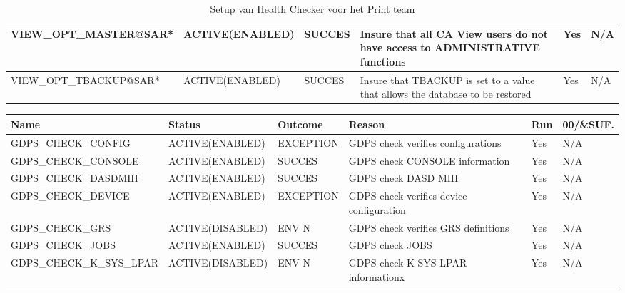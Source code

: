 \begin{landscape}
\begin{table}[h]
\begin{tabular}{|l|l|l|p{4.5cm}|l|l|}
			VIEW\_OPT\_MASTER@SAR*      & ACTIVE(ENABLED) & SUCCES           & Insure   that all CA View users do not have access to ADMINISTRATIVE functions             & Yes          & N/A                \\ \hline
			VIEW\_OPT\_TBACKUP@SAR*     & ACTIVE(ENABLED) & SUCCES           & Insure   that TBACKUP is set to a value that allows the database to be restored            & Yes          & N/A                \\ \hline
		\end{tabular}
		\caption[Health Checker Setup Print team]{Setup van Health Checker voor het Print team}
		\label{tbl:Print Team Tabel}
	\end{table}
\end{landscape}

\begin{landscape}
	\begin{table}[h]
		\begin{tabular}{|l|l|l|p{4.5cm}|l|l|}
			\hline
			\textbf{Name}             & \textbf{Status}  & \textbf{Outcome} & \textbf{Reason}                                 & \textbf{Run} & \textbf{00/\&SUF.} \\ \hline
			GDPS\_CHECK\_CONFIG       & ACTIVE(ENABLED)  & EXCEPTION        & GDPS check verifies configurations              & Yes          & N/A                \\ \hline
			GDPS\_CHECK\_CONSOLE      & ACTIVE(ENABLED)  & SUCCES           & GDPS   check CONSOLE information                & Yes          & N/A                \\ \hline
			GDPS\_CHECK\_DASDMIH      & ACTIVE(ENABLED)  & SUCCES           & GDPS   check DASD MIH                           & Yes          & N/A                \\ \hline
			GDPS\_CHECK\_DEVICE       & ACTIVE(ENABLED)  & EXCEPTION        & GDPS   check verifies device configuration      & Yes          & N/A                \\ \hline
			GDPS\_CHECK\_GRS          & ACTIVE(DISABLED) & ENV N            & GDPS check verifies GRS definitions             & Yes          & N/A                \\ \hline
			GDPS\_CHECK\_JOBS         & ACTIVE(ENABLED)  & SUCCES           & GDPS   check JOBS                               & Yes          & N/A                \\ \hline
			GDPS\_CHECK\_K\_SYS\_LPAR & ACTIVE(DISABLED) & ENV N            & GDPS check K SYS LPAR informationx              & Yes          & N/A                \\ \hline

\end{tabular}
\end{table}
\end{landscape}
